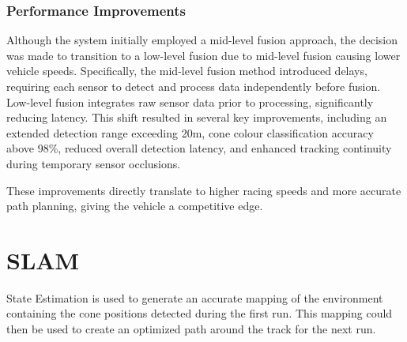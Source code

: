 \documentclass[conference]{IEEEtran}
\begin{document}
\subsubsection{Performance Improvements}
Although the system initially employed a mid-level fusion approach, the decision was made to transition to a low-level fusion due to mid-level fusion causing lower vehicle speeds. Specifically, the mid-level fusion method introduced delays, requiring each sensor to detect and process data independently before fusion. Low-level fusion integrates raw sensor data prior to processing, significantly reducing latency. This shift resulted in several key improvements, including an extended detection range exceeding 20m, cone colour classification accuracy above 98\%, reduced overall detection latency, and enhanced tracking continuity during temporary sensor occlusions.

These improvements directly translate to higher racing speeds and more accurate path planning, giving the vehicle a competitive edge.

\section{SLAM}
State Estimation is used to generate an accurate mapping of the environment containing the cone positions detected during the first run. This mapping could then be used to create an optimized path around the track for the next run.
\end{document}

